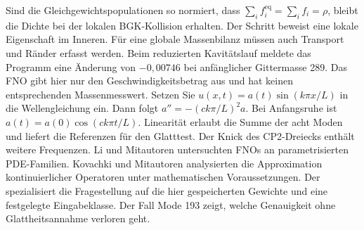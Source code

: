 Sind die Gleichgewichtspopulationen so normiert, dass \(\sum_i f_i^{\mathrm{eq}}=\sum_i f_i=\rho\), bleibt die Dichte bei der lokalen BGK-Kollision erhalten.
Der Schritt beweist eine lokale Eigenschaft im Inneren. Für eine globale Massenbilanz müssen auch Transport und Ränder erfasst werden. Beim reduzierten Kavitätslauf meldete das Programm eine Änderung von \(-0{,}00746\) bei anfänglicher Gittermasse 289. Das FNO gibt hier nur den Geschwindigkeitsbetrag aus und hat keinen entsprechenden Massenmesswert.
Setzen Sie \(u(x,t)=a(t)\sin(k\pi x/L)\) in die Wellengleichung ein. Dann folgt \(a''=-(ck\pi/L)^2a\). Bei Anfangsruhe ist \(a(t)=a(0)\cos(ck\pi t/L)\). Linearität erlaubt die Summe der acht Moden und liefert die Referenzen für den Glatttest. Der Knick des CP2-Dreiecks enthält weitere Frequenzen.
Li und Mitautoren untersuchten FNOs an parametrisierten PDE-Familien. Kovachki und Mitautoren analysierten die Approximation kontinuierlicher Operatoren unter mathematischen Voraussetzungen. Der  spezialisiert die Fragestellung auf die hier gespeicherten Gewichte und eine festgelegte Eingabeklasse. Der Fall Mode 193 zeigt, welche Genauigkeit ohne Glattheitsannahme verloren geht.
